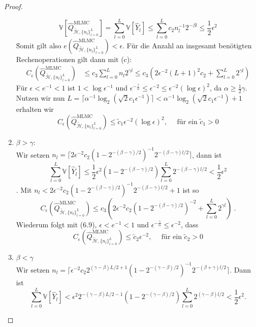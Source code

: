 \begin{proof}
\begin{enumerate}[label=(\roman*)]
		\[
		\mathbb{V}[\widehat{Q}_{\tilde{\mathcal{H}},\{ n_l \}_{l=0}^L }^{\text{MLMC}}] = \sum_{l=0}^{L}\mathbb{V}[\widehat{Y}_l] \leq \sum_{l=0}^{L} c_2 n_l^{-1} 2^{- \beta l} \leq \frac{1}{2} \epsilon^2
		\] \.
		Somit gilt also $ e(\widehat{Q}_{\tilde{\mathcal{H}},\{ n_l \}_{l=0}^L }^{\text{MLMC}}) < \epsilon $.
		Für die Anzahl an insgesamt benötigten Rechenoperationen gilt dann mit (c):
		\begin{align*}
			C_{\epsilon}(\widehat{Q}_{\tilde{\mathcal{H}},\{ n_l \}_{l=0}^L }^{\text{MLMC}})  &\leq c_3 \sum_{l=0}^{L} n_l 2^{\gamma l} 
			\leq c_3 \left( 2 \epsilon^{-2}(L+1)^2 c_2 + \sum_{l=0}^{L} 2^{\gamma l} \right)
		\end{align*}
		Für $ \epsilon < e^{-1} < 1 $ ist $ 1 < \log \epsilon^{-1} $ und $ \epsilon^{- \frac{\gamma}{\alpha}} \leq \epsilon^{-2} \leq \epsilon^{-2}(\log \epsilon)^2$, da $ \alpha \geq \frac{1}{2} \gamma $.
		Nutzen wir nun $ L = \lceil \alpha^{-1} \log_2 (\sqrt{2}c_1\epsilon^{-1}) \rceil < \alpha^{-1} \log_2 (\sqrt{2}c_1\epsilon^{-1}) +1 $  erhalten wir 
		\[
			C_{\epsilon}(\widehat{Q}_{\tilde{\mathcal{H}},\{ n_l \}_{l=0}^L }^{\text{MLMC}}) \leq \tilde{c}_1 \epsilon^{-2} (\log \epsilon )^2 , \quad \text{ für ein }\tilde{c}_1>0
		\]
		\item $ \beta > \gamma: $\\
		Wir setzen $ n_l = \lceil 2\epsilon^{-2} c_2 (1-2^{-(\beta-\gamma)/2})^{-1} 2^{-(\beta-\gamma)l/2} \rceil $, dann ist
		\[
		\sum_{l=0}^{L} \mathbb{V}[\widehat{Y}_l] \leq \frac{1}{2}\epsilon^2\left( 1-2^{-(\beta - \gamma)/2} \right) \sum_{l=0}^{L} 2^{-(\beta - \gamma)l/2} < \frac{1}{2} \epsilon^2
		\].
		Mit $ n_l <  2\epsilon^{-2} c_2 (1-2^{-(\beta-\gamma)/2})^{-1} 2^{-(\beta-\gamma)l/2} +1 $ ist so 
		\[
			C_{\epsilon}(\widehat{Q}_{\tilde{\mathcal{H}},\{ n_l \}_{l=0}^L }^{\text{MLMC}}) \leq c_3 \left( 2\epsilon^{-2}c_2 \left( 1 - 2^{-(\beta-\gamma)/2}\right)^{-2} + \sum_{l=0}^{L}2^{\gamma l} \right) \ .
		\] 
		Wiederum folgt mit (6.9), $ \epsilon < e^{-1} <1 $ und $ \epsilon^{-\frac{\gamma}{\alpha}} \leq \epsilon^{-2} $, dass
		\[
			C_{\epsilon}(\widehat{Q}_{\tilde{\mathcal{H}},\{ n_l \}_{l=0}^L }^{\text{MLMC}}) \leq \tilde{c}_2 \epsilon^{-2}, \quad \text{  für ein }\tilde{c}_2>0
		\]
		\item $ \beta < \gamma $\\
		Wir setzen $ n_l =  \lceil  \epsilon^{-2} c_2 2^{(\gamma-\beta)L/2+1} \left( 1-2^{-(\gamma - \beta)/2} \right)^{-1} 2^{-(\beta+\gamma)l/2} \rceil $.
		Dann ist 
		\[
		\sum\limits_{l=0}^{L} \mathbb{V}[\widehat{Y}_l] < \epsilon^2 2^{-(\gamma-\beta)L/2 -1}\left( 1- 2^{-(\gamma-\beta)/2} \right) \sum_{l=0}^{L} 2^{(\gamma-\beta)l/2} < \frac{1}{2} \epsilon^2 . 
\]
\end{enumerate}
\end{proof}
